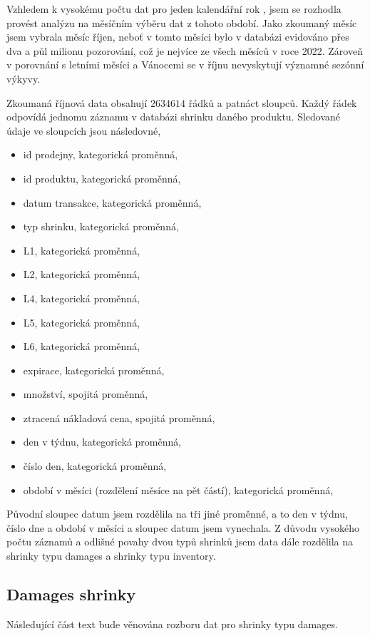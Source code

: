 
Vzhledem k vysokému počtu dat pro jeden kalendářní rok %
, jsem se rozhodla provést analýzu na měsíčním výběru dat z tohoto období. Jako zkoumaný měsíc jsem vybrala měsíc říjen, neboť v tomto měsíci bylo v databázi evidováno přes dva a půl milionu pozorování, což je nejvíce ze všech měsíců v roce 2022.  %
Zároveň v porovnání s letními měsíci a Vánocemi se v říjnu nevyskytují významné sezónní výkyvy.

Zkoumaná říjnová data obsahují $2 634 614$ řádků a patnáct sloupců. Každý řádek odpovídá jednomu záznamu v databázi shrinku daného produktu. Sledované údaje ve sloupcích jsou následovné, 
\begin{itemize}
    \item id prodejny, kategorická proměnná,
    \item id produktu, kategorická proměnná,
    \item datum transakce, kategorická proměnná,
    \item typ shrinku, kategorická proměnná,
    \item L1, kategorická proměnná,
    \item L2, kategorická proměnná,
    \item L4, kategorická proměnná,
    \item L5, kategorická proměnná,
    \item L6, kategorická proměnná,
    \item expirace, kategorická proměnná,
    \item množství, spojitá proměnná,
    \item ztracená nákladová cena, spojitá proměnná,
    \item den v týdnu, kategorická proměnná,
    \item číslo den, kategorická proměnná,
    \item období v měsíci (rozdělení měsíce na pět částí), kategorická proměnná,
\end{itemize}
Původní sloupec datum jsem rozdělila na tři jiné proměnné, a to den v týdnu, číslo dne a období v měsíci a sloupec datum jsem vynechala. Z důvodu vysokého počtu záznamů a odlišné povahy dvou typů shrinků jsem data dále rozdělila na shrinky typu damages a shrinky typu inventory. 


\subsection*{Damages shrinky}
Následující část text bude věnována rozboru dat pro shrinky typu damages.


